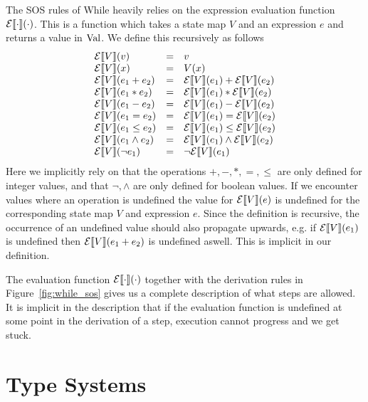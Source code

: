 The SOS rules of While heavily relies on the expression evaluation function
$\mathcal{E}\llbracket \cdot \rrbracket(\cdot)$. This is a function which takes a state map $V$ and an
expression $e$ and returns a value in $\mbox{$\mathrm{Val}$}$. We define this recursively as follows
\begin{equation*}
  \begin{array}{lll}
    \mathcal{E}\llbracket V \rrbracket(v) &=& v \\
    \mathcal{E}\llbracket V \rrbracket(x) &=& V(x) \\
    \mathcal{E}\llbracket V \rrbracket(e_1 + e_2) &=& \mathcal{E}\llbracket V \rrbracket(e_1) + \mathcal{E}\llbracket V \rrbracket(e_2) \\
    \mathcal{E}\llbracket V \rrbracket(e_1 * e_2) &=& \mathcal{E}\llbracket V \rrbracket(e_1) * \mathcal{E}\llbracket V \rrbracket(e_2) \\
    \mathcal{E}\llbracket V \rrbracket(e_1 - e_2) &=& \mathcal{E}\llbracket V \rrbracket(e_1) - \mathcal{E}\llbracket V \rrbracket(e_2) \\
    \mathcal{E}\llbracket V \rrbracket(e_1 = e_2) &=& \mathcal{E}\llbracket V \rrbracket(e_1) = \mathcal{E}\llbracket V \rrbracket(e_2) \\
    \mathcal{E}\llbracket V \rrbracket(e_1 \leq e_2) &=& \mathcal{E}\llbracket V \rrbracket(e_1) \leq \mathcal{E}\llbracket V \rrbracket(e_2) \\
    \mathcal{E}\llbracket V \rrbracket(e_1 \land e_2) &=& \mathcal{E}\llbracket V \rrbracket(e_1) \land \mathcal{E}\llbracket V \rrbracket(e_2) \\
    \mathcal{E}\llbracket V \rrbracket(\lnot e_1) &=& \lnot \mathcal{E}\llbracket V \rrbracket(e_1) \\
  \end{array}
\end{equation*}
Here we implicitly rely on that the operations $+, -, *, =, \leq$ are only
defined for integer values, and that $\lnot, \land$ are only defined for boolean
values.  If we encounter values where an operation is undefined the value for
$\mathcal{E}\llbracket V \rrbracket(e)$ is undefined for the corresponding state map $V$ and expression
$e$. Since the definition is recursive, the occurrence of an undefined value
should also propagate upwards, e.g. if $\mathcal{E}\llbracket V \rrbracket(e_1)$ is undefined
then $\mathcal{E}\llbracket V \rrbracket(e_1 + e_2)$ is undefined aswell. This is implicit in our
definition.


The evaluation function $\mathcal{E}\llbracket \cdot \rrbracket(\cdot)$ together with the derivation
rules in Figure~\ref{fig:while_sos} gives us a complete description of what
steps are allowed. It is implicit in the description that if the evaluation
function is undefined at some point in the derivation of a step, execution
cannot progress and we get stuck.

\section{Type Systems} \label{sec:type_systems}

